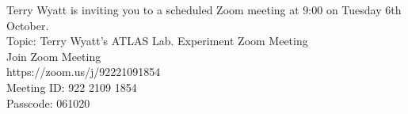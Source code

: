\documentclass[11pt]{article}
\begin{document}
    Terry Wyatt is inviting you to a scheduled Zoom meeting at 9:00 on Tuesday 6th October.\\
    Topic: Terry Wyatt's ATLAS Lab. Experiment Zoom Meeting\\
    Join Zoom Meeting\\
    https://zoom.us/j/92221091854\\
    Meeting ID: 922 2109 1854\\
    Passcode: 061020\\
\end{document}
